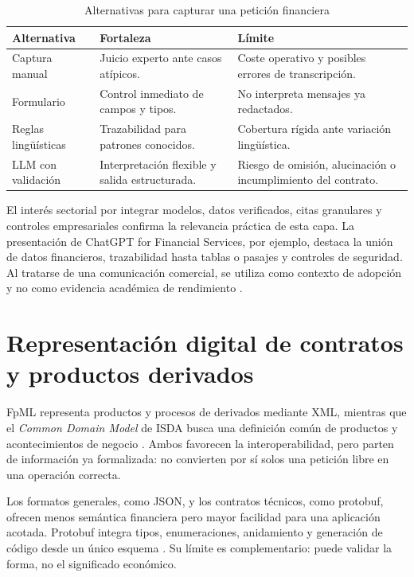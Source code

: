 \begin{table}[H]
\centering
\small
\caption{Alternativas para capturar una petición financiera}
\label{tab:alternativas_captura_financiera}
\begin{tabular}{|P{2.8cm}|P{4.6cm}|P{5.2cm}|}
\hline
\textbf{Alternativa} & \textbf{Fortaleza} & \textbf{Límite} \\
\hline
Captura manual & Juicio experto ante casos atípicos. & Coste operativo y posibles errores de transcripción. \\
\hline
Formulario & Control inmediato de campos y tipos. & No interpreta mensajes ya redactados. \\
\hline
Reglas lingüísticas & Trazabilidad para patrones conocidos. & Cobertura rígida ante variación lingüística. \\
\hline
LLM con validación & Interpretación flexible y salida estructurada. & Riesgo de omisión, alucinación o incumplimiento del contrato. \\
\hline
\end{tabular}
\end{table}

El interés sectorial por integrar modelos, datos verificados, citas granulares y controles empresariales confirma la relevancia práctica de esta capa. La presentación de ChatGPT for Financial Services, por ejemplo, destaca la unión de datos financieros, trazabilidad hasta tablas o pasajes y controles de seguridad. Al tratarse de una comunicación comercial, se utiliza como contexto de adopción y no como evidencia académica de rendimiento \citep{openai2026financialservices}.

\section{Representación digital de contratos y productos derivados}
\label{sec:representacion_digital_derivados}

FpML representa productos y procesos de derivados mediante XML, mientras que el \textit{Common Domain Model} de ISDA busca una definición común de productos y acontecimientos de negocio \citep{fpml-home,isda2023cdm}. Ambos favorecen la interoperabilidad, pero parten de información ya formalizada: no convierten por sí solos una petición libre en una operación correcta.

Los formatos generales, como JSON, y los contratos técnicos, como protobuf, ofrecen menos semántica financiera pero mayor facilidad para una aplicación acotada. Protobuf integra tipos, enumeraciones, anidamiento y generación de código desde un único esquema \citep{protobuf-overview}. Su límite es complementario: puede validar la forma, no el significado económico.

